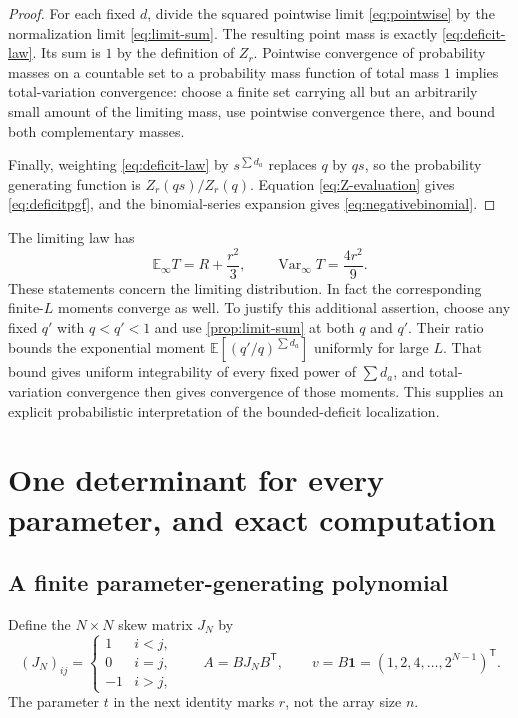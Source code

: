 \documentclass[11pt]{article}
\numberwithin{equation}{section}
\theoremstyle{definition}
\newcommand{\EE}{\mathbb{E}}
\newcommand{\one}{\mathbf{1}}
\begin{document}
\begin{proof}
For each fixed $d$, divide the squared pointwise limit \eqref{eq:pointwise} by the normalization limit \eqref{eq:limit-sum}. The resulting point mass is exactly \eqref{eq:deficit-law}. Its sum is $1$ by the definition of $Z_r$. Pointwise convergence of probability masses on a countable set to a probability mass function of total mass $1$ implies total-variation convergence: choose a finite set carrying all but an arbitrarily small amount of the limiting mass, use pointwise convergence there, and bound both complementary masses.

Finally, weighting \eqref{eq:deficit-law} by $s^{\sum d_a}$ replaces $q$ by $qs$, so the probability generating function is $Z_r(qs)/Z_r(q)$. Equation \eqref{eq:Z-evaluation} gives \eqref{eq:deficitpgf}, and the binomial-series expansion gives \eqref{eq:negativebinomial}.
\end{proof}

The limiting law has
\begin{equation}\label{eq:deficitmoments}
 \EE_\infty T=R+\frac{r^2}{3},\qquad
 \operatorname{Var}_\infty T=\frac{4r^2}{9}.
\end{equation}
These statements concern the limiting distribution. In fact the corresponding finite-$L$ moments converge as well. To justify this additional assertion, choose any fixed $q'$ with $q<q'<1$ and use \cref{prop:limit-sum} at both $q$ and $q'$. Their ratio bounds the exponential moment $\EE[(q'/q)^{\sum d_a}]$ uniformly for large $L$. That bound gives uniform integrability of every fixed power of $\sum d_a$, and total-variation convergence then gives convergence of those moments. This supplies an explicit probabilistic interpretation of the bounded-deficit localization.

\section{One determinant for every parameter, and exact computation}\label{sec:algorithm}

\subsection{A finite parameter-generating polynomial}
Define the $N\times N$ skew matrix $J_N$ by
\[
 (J_N)_{ij}=\begin{cases}1&i<j,\\0&i=j,\\-1&i>j,\end{cases}
 \qquad A=BJ_NB^{\mathsf T},\qquad
 v=B\one=(1,2,4,\ldots,2^{N-1})^{\mathsf T}.
\]
The parameter $t$ in the next identity marks $r$, not the array size $n$.
\end{document}

